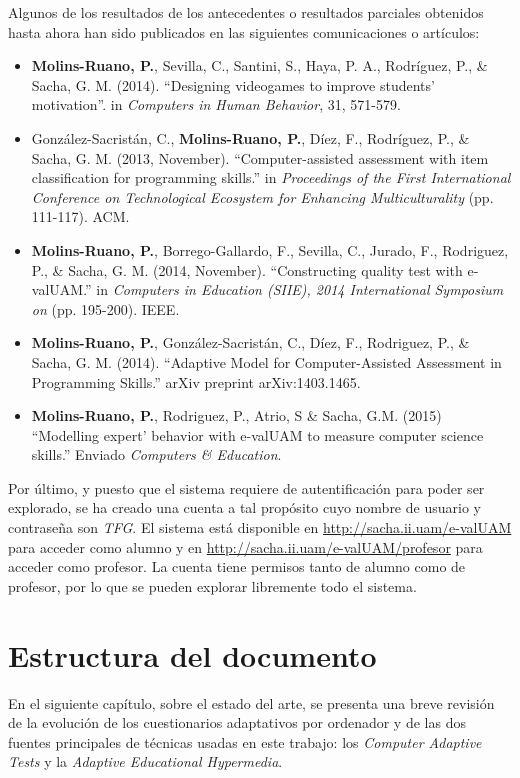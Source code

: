 Algunos de los resultados de los antecedentes o resultados parciales obtenidos hasta ahora han sido publicados en las siguientes comunicaciones o artículos:

\begin{itemize}
	\item \textbf{Molins-Ruano, P.}, Sevilla, C., Santini, S., Haya, P. A., Rodríguez, P., \& Sacha, G. M. (2014). ``Designing videogames to improve students' motivation''. in \textit{Computers in Human Behavior}, 31, 571-579.
	\item González-Sacristán, C., \textbf{Molins-Ruano, P.}, Díez, F., Rodríguez, P., \& Sacha, G. M. (2013, November). ``Computer-assisted assessment with item classification for programming skills.'' in \textit{Proceedings of the First International Conference on Technological Ecosystem for Enhancing Multiculturality} (pp. 111-117). ACM.
	\item \textbf{Molins-Ruano, P.}, Borrego-Gallardo, F., Sevilla, C., Jurado, F., Rodriguez, P., \& Sacha, G. M. (2014, November). ``Constructing quality test with e-valUAM.'' in \textit{Computers in Education (SIIE), 2014 International Symposium on} (pp. 195-200). IEEE.
	\item \textbf{Molins-Ruano, P.}, González-Sacristán, C., Díez, F., Rodriguez, P., \& Sacha, G. M. (2014). ``Adaptive Model for Computer-Assisted Assessment in Programming Skills.'' arXiv preprint arXiv:1403.1465.
	\item \textbf{Molins-Ruano, P.}, Rodriguez, P., Atrio, S \& Sacha, G.M. (2015) ``Modelling expert' behavior with e-valUAM to measure computer science skills.'' Enviado \textit{Computers \& Education}. 
\end{itemize}

Por último, y puesto que el sistema requiere de autentificación para poder ser explorado, se ha creado una cuenta a tal propósito cuyo nombre de usuario y contraseña son \textit{TFG}. El sistema está disponible en \url{http://sacha.ii.uam/e-valUAM} para acceder como alumno y en \url{http://sacha.ii.uam/e-valUAM/profesor} para acceder como profesor. La cuenta tiene permisos tanto de alumno como de profesor, por lo que se pueden explorar libremente todo el sistema.

\section{Estructura del documento}

En el siguiente capítulo, sobre el estado del arte, se presenta una breve revisión de la evolución de los cuestionarios adaptativos por ordenador y de las dos fuentes principales de técnicas usadas en este trabajo: los \textit{Computer Adaptive Tests} y la \textit{Adaptive Educational Hypermedia}.

